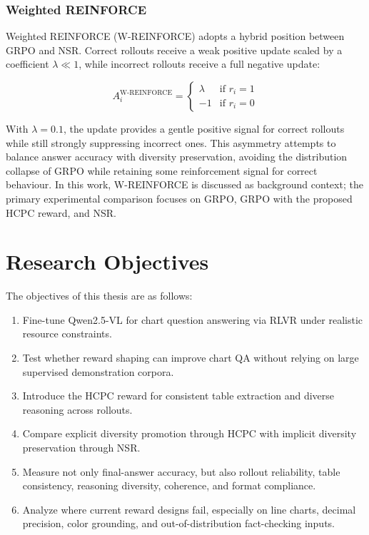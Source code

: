 \documentclass{iutbscthesis}
\begin{document}
\subsubsection{Weighted REINFORCE}

Weighted REINFORCE (W-REINFORCE) \cite{yu2025dapo} adopts a hybrid position
between GRPO and NSR. Correct rollouts receive a weak positive update scaled by a
coefficient $\lambda \ll 1$, while incorrect rollouts receive a full negative update:

\begin{equation}
    A_i^{\text{W-REINFORCE}} = \begin{cases}
        \lambda  & \text{if } r_i = 1 \\
        -1       & \text{if } r_i = 0
    \end{cases}
\end{equation}

\noindent With $\lambda = 0.1$, the update provides a gentle positive signal for correct
rollouts while still strongly suppressing incorrect ones. This asymmetry attempts to
balance answer accuracy with diversity preservation, avoiding the distribution collapse
of GRPO while retaining some reinforcement signal for correct behaviour. In this
work, W-REINFORCE is discussed as background context; the primary experimental
comparison focuses on GRPO, GRPO with the proposed HCPC reward, and NSR.

\section{Research Objectives}

The objectives of this thesis are as follows:

\begin{enumerate}
    \item Fine-tune Qwen2.5-VL for chart question answering via RLVR under realistic resource constraints.
    \item Test whether reward shaping can improve chart QA without relying on large supervised demonstration corpora.
    \item Introduce the HCPC reward for consistent table extraction and diverse reasoning across rollouts.
    \item Compare explicit diversity promotion through HCPC with implicit diversity preservation through NSR.
    \item Measure not only final-answer accuracy, but also rollout reliability, table consistency, reasoning diversity, coherence, and format compliance.
    \item Analyze where current reward designs fail, especially on line charts, decimal precision, color grounding, and out-of-distribution fact-checking inputs.
\end{enumerate}
\end{document}
